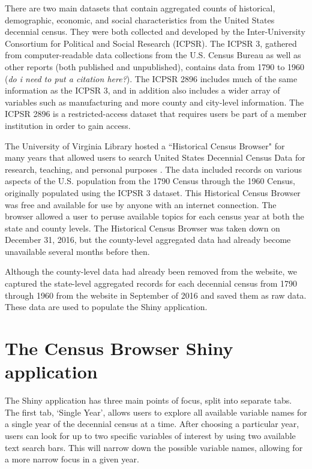 \documentclass[DIV=calc, paper=a4, fontsize=10pt, twocolumn]{scrartcl}\usepackage[]{graphicx}\usepackage[]{color}
\begin{document}
\par There are two main datasets that contain aggregated counts of historical, demographic, economic, and social characteristics from the United States decennial census. They were both collected and developed by the Inter-University Consortium for Political and Social Research (ICPSR). The ICPSR 3, gathered from computer-readable data collections from the U.S. Census Bureau as well as other reports (both published and unpublished), contains data from 1790 to 1960 (\textit{do i need to put a citation here?}). The ICPSR 2896 includes much of the same information as the ICPSR 3, and in addition also includes a wider array of variables such as manufacturing and more county and city-level information. The ICPSR 2896 is a restricted-access dataset that requires users be part of a member institution in order to gain access.  

\par The University of Virginia Library hosted a ``Historical Census Browser" for many years that allowed users to search United States Decennial Census Data for research, teaching, and personal purposes \citep{HCB}. The data included records on various aspects of the U.S. population from the 1790 Census through the 1960 Census, originally populated using the ICPSR 3 dataset. This Historical Census Browser was free and available for use by anyone with an internet connection. The browser allowed a user to peruse available topics for each census year at both the state and county levels. The Historical Census Browser was taken down on December 31, 2016, but the county-level aggregated data had already become unavailable several months before then.  

\par Although the county-level data had already been removed from the website, we captured the state-level aggregated records for each decennial census from 1790 through 1960 from the website in September of 2016 and saved them as raw data. These data are used to populate the Shiny application.  


\section*{The Census Browser Shiny application}  

\par The Shiny application has three main points of focus, split into separate tabs. The first tab, `Single Year', allows users to explore all available variable names for a single year of the decennial census at a time. After choosing a particular year, users can look for up to two specific variables of interest by using two available text search bars. This will narrow down the possible variable names, allowing for a more narrow focus in a given year.  
\end{document}
